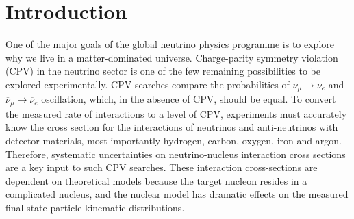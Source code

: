 \section{Introduction}
One of the major goals of the global neutrino physics programme is to explore why we live in a matter-dominated universe. Charge-parity symmetry violation (CPV) in the neutrino sector is one of the few remaining possibilities to be explored experimentally. 
CPV searches compare the probabilities of $\nu_{\mu}\!\rightarrow\!\nu_e$ and $\overline{\nu}_{\mu}\!\rightarrow\!\overline{\nu}_e$ oscillation, which, in the absence of CPV, should be equal. 
To convert the measured rate of interactions to a level of CPV, experiments must accurately know the cross section for the interactions of neutrinos and anti-neutrinos with detector materials, most importantly hydrogen, carbon, oxygen, iron and argon. 
Therefore, systematic uncertainties on neutrino-nucleus interaction cross sections are a key input to such CPV searches.  
These interaction cross-sections are dependent on theoretical models because the target nucleon resides in a complicated nucleus, and the nuclear model has dramatic effects on the measured final-state particle kinematic distributions.

